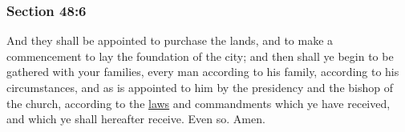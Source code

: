 	\subsubsection{Section 48:6} %
		\label{DC48-6}

		And they shall be appointed to purchase the lands, and to make a commencement to lay the foundation of the city; and then shall ye begin to be gathered with your families, every man according to his family, according to his circumstances, and as is appointed to him by the presidency and the bishop of the church, according to the \hyperref[LAW]{laws} and commandments which ye have received, and which ye shall hereafter receive.  Even so.  Amen.

